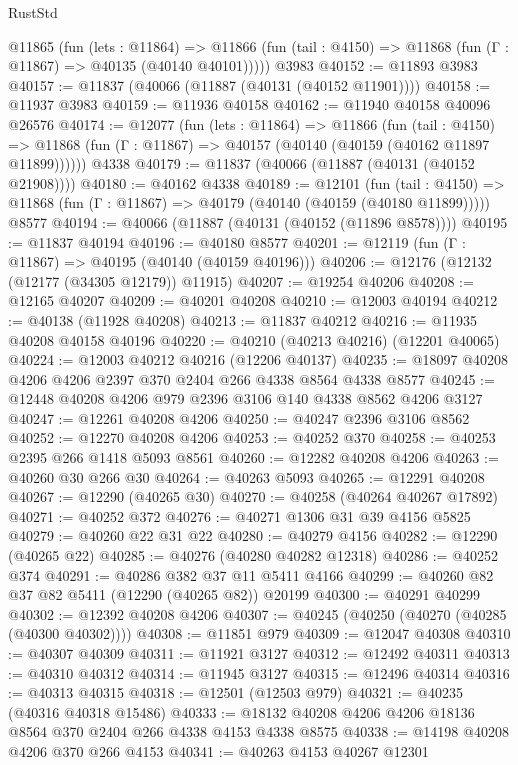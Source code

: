 \begin{lexlean}{RustStd}
\begin{coremodule}
{\begin{coremodule}
{{{{{{{{{{{{{{{{{{{{{{{{{{{{{{{{{{{{{{{{{{{{{{{{{{    @11865
      (fun (lets : @11864) =>
      @11866 (fun (tail : @4150) => @11868 (fun (Γ : @11867) => @40135 (@40140 @40101)))))
    @3983
@40152 := @11893 @3983
@40157 := @11837 (@40066 (@11887 (@40131 (@40152 @11901))))
@40158 := @11937 @3983
@40159 := @11936 @40158
@40162 := @11940 @40158 @40096 @26576
@40174 := @12077
    (fun (lets : @11864) =>
    @11866
      (fun (tail : @4150) =>
      @11868 (fun (Γ : @11867) => @40157 (@40140 (@40159 (@40162 @11897 @11899))))))
    @4338
@40179 := @11837 (@40066 (@11887 (@40131 (@40152 @21908))))
@40180 := @40162 @4338
@40189 := @12101
    (fun (tail : @4150) => @11868 (fun (Γ : @11867) => @40179 (@40140 (@40159 (@40180 @11899)))))
    @8577
@40194 := @40066 (@11887 (@40131 (@40152 (@11896 @8578))))
@40195 := @11837 @40194
@40196 := @40180 @8577
@40201 := @12119 (fun (Γ : @11867) => @40195 (@40140 (@40159 @40196)))
@40206 := @12176 (@12132 (@12177 (@34305 @12179)) @11915)
@40207 := @19254 @40206
@40208 := @12165 @40207
@40209 := @40201 @40208
@40210 := @12003 @40194
@40212 := @40138 (@11928 @40208)
@40213 := @11837 @40212
@40216 := @11935 @40208 @40158 @40196
@40220 := @40210 (@40213 @40216) (@12201 @40065)
@40224 := @12003 @40212 @40216 (@12206 @40137)
@40235 := @18097 @40208 @4206 @4206 @2397 @370 @2404 @266 @4338 @8564 @4338 @8577
@40245 := @12448 @40208 @4206 @979 @2396 @3106 @140 @4338 @8562 @4206 @3127
@40247 := @12261 @40208 @4206
@40250 := @40247 @2396 @3106 @8562
@40252 := @12270 @40208 @4206
@40253 := @40252 @370
@40258 := @40253 @2395 @266 @1418 @5093 @8561
@40260 := @12282 @40208 @4206
@40263 := @40260 @30 @266 @30
@40264 := @40263 @5093
@40265 := @12291 @40208
@40267 := @12290 (@40265 @30)
@40270 := @40258 (@40264 @40267 @17892)
@40271 := @40252 @372
@40276 := @40271 @1306 @31 @39 @4156 @5825
@40279 := @40260 @22 @31 @22
@40280 := @40279 @4156
@40282 := @12290 (@40265 @22)
@40285 := @40276 (@40280 @40282 @12318)
@40286 := @40252 @374
@40291 := @40286 @382 @37 @11 @5411 @4166
@40299 := @40260 @82 @37 @82 @5411 (@12290 (@40265 @82)) @20199
@40300 := @40291 @40299
@40302 := @12392 @40208 @4206
@40307 := @40245 (@40250 (@40270 (@40285 (@40300 @40302))))
@40308 := @11851 @979
@40309 := @12047 @40308
@40310 := @40307 @40309
@40311 := @11921 @3127
@40312 := @12492 @40311
@40313 := @40310 @40312
@40314 := @11945 @3127
@40315 := @12496 @40314
@40316 := @40313 @40315
@40318 := @12501 (@12503 @979)
@40321 := @40235 (@40316 @40318 @15486)
@40333 := @18132 @40208 @4206 @4206 @18136 @8564 @370 @2404 @266 @4338 @4153 @4338 @8575
@40338 := @14198 @40208 @4206 @370 @266 @4153
@40341 := @40263 @4153 @40267 @12301
}}}}}}}}}}}}}}}}}}}}}}}}}}}}}}}}}}}}}}}}}}}}}}}}}}
\end{coremodule}}
\end{coremodule}
\end{lexlean}
